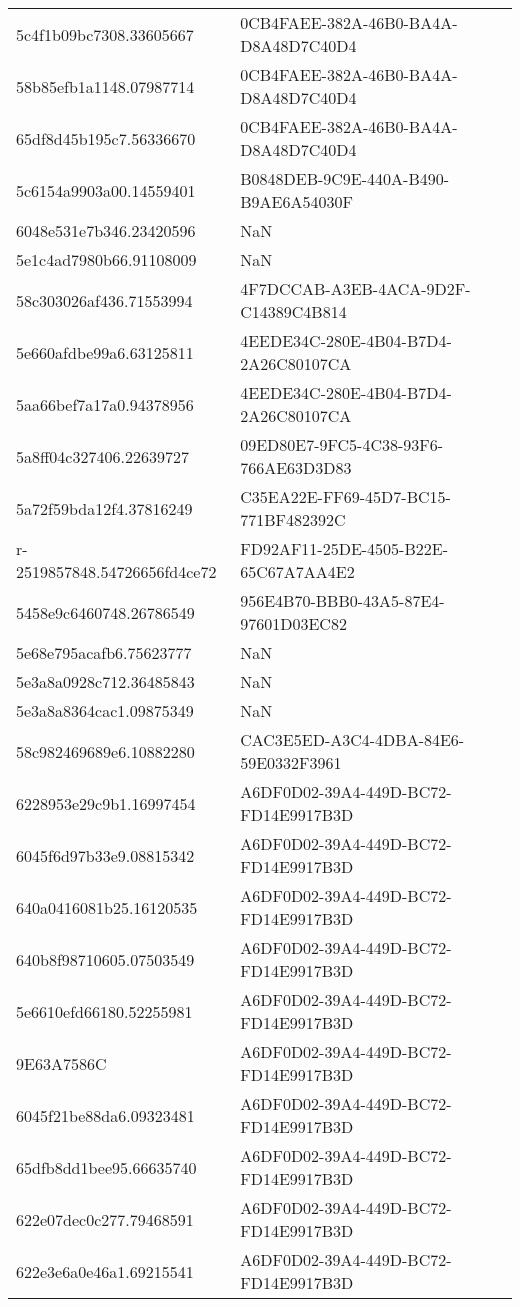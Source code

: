 \begin{tabular}{ll}
5c4f1b09bc7308.33605667 & 0CB4FAEE-382A-46B0-BA4A-D8A48D7C40D4 \\
58b85efb1a1148.07987714 & 0CB4FAEE-382A-46B0-BA4A-D8A48D7C40D4 \\
65df8d45b195c7.56336670 & 0CB4FAEE-382A-46B0-BA4A-D8A48D7C40D4 \\
5c6154a9903a00.14559401 & B0848DEB-9C9E-440A-B490-B9AE6A54030F \\
6048e531e7b346.23420596 & NaN \\
5e1c4ad7980b66.91108009 & NaN \\
58c303026af436.71553994 & 4F7DCCAB-A3EB-4ACA-9D2F-C14389C4B814 \\
5e660afdbe99a6.63125811 & 4EEDE34C-280E-4B04-B7D4-2A26C80107CA \\
5aa66bef7a17a0.94378956 & 4EEDE34C-280E-4B04-B7D4-2A26C80107CA \\
5a8ff04c327406.22639727 & 09ED80E7-9FC5-4C38-93F6-766AE63D3D83 \\
5a72f59bda12f4.37816249 & C35EA22E-FF69-45D7-BC15-771BF482392C \\
r-2519857848.54726656fd4ce72 & FD92AF11-25DE-4505-B22E-65C67A7AA4E2 \\
5458e9c6460748.26786549 & 956E4B70-BBB0-43A5-87E4-97601D03EC82 \\
5e68e795acafb6.75623777 & NaN \\
5e3a8a0928c712.36485843 & NaN \\
5e3a8a8364cac1.09875349 & NaN \\
58c982469689e6.10882280 & CAC3E5ED-A3C4-4DBA-84E6-59E0332F3961 \\
6228953e29c9b1.16997454 & A6DF0D02-39A4-449D-BC72-FD14E9917B3D \\
6045f6d97b33e9.08815342 & A6DF0D02-39A4-449D-BC72-FD14E9917B3D \\
640a0416081b25.16120535 & A6DF0D02-39A4-449D-BC72-FD14E9917B3D \\
640b8f98710605.07503549 & A6DF0D02-39A4-449D-BC72-FD14E9917B3D \\
5e6610efd66180.52255981 & A6DF0D02-39A4-449D-BC72-FD14E9917B3D \\
9E63A7586C & A6DF0D02-39A4-449D-BC72-FD14E9917B3D \\
6045f21be88da6.09323481 & A6DF0D02-39A4-449D-BC72-FD14E9917B3D \\
65dfb8dd1bee95.66635740 & A6DF0D02-39A4-449D-BC72-FD14E9917B3D \\
622e07dec0c277.79468591 & A6DF0D02-39A4-449D-BC72-FD14E9917B3D \\
622e3e6a0e46a1.69215541 & A6DF0D02-39A4-449D-BC72-FD14E9917B3D \\

\end{tabular}
